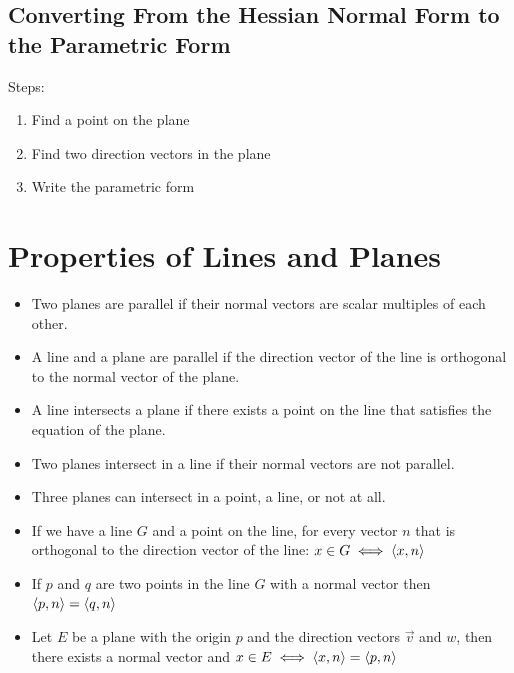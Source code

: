 \subsection{Converting From the Hessian Normal Form to the Parametric Form}

Steps:

\begin{enumerate}

	\item Find a point on the plane

	\item Find two direction vectors in the plane

	\item Write the parametric form

\end{enumerate}

\section{Properties of Lines and Planes}

\begin{itemize}

	\item Two planes are parallel if their normal vectors are scalar multiples of each other.

	\item A line and a plane are parallel if the direction vector of the line is orthogonal to the normal vector of the plane.

	\item A line intersects a plane if there exists a point on the line that satisfies the equation of the plane.

	\item Two planes intersect in a line if their normal vectors are not parallel.

	\item Three planes can intersect in a point, a line, or not at all.

	\item If we have a line \(G\) and a point on the line, for every vector \(n\) that is orthogonal to the
 	      direction vector of the line: \(x \in G \iff \left\langle x, n\right\rangle\)

	\item If \(p\) and \(q\) are two points in the line \(G\) with a normal vector then \(\left\langle p, n\right\rangle = \left\langle q, n\right\rangle\)

	\item Let \(E\) be a plane with the origin \(p\) and the direction vectors \(\vec{v}\) and \(w\), then there exists a normal vector and
	      \(x \in E \iff \left\langle x, n\right\rangle = \left\langle p, n\right\rangle\)

\end{itemize}

